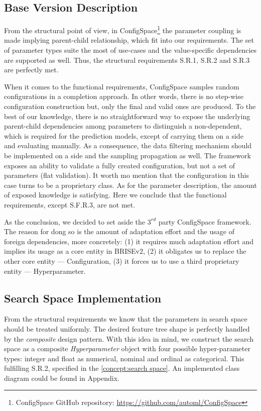 \subsection{Base Version Description}
From the structural point of view, in ConfigSpace\footnote{ConfigSpace GitHub repository: \url{https://github.com/automl/ConfigSpace}} the parameter coupling is made implying parent-child relationship, which fit into our requirements. The set of parameter types suite the most of use-cases and the value-specific dependencies are supported as well. Thus, the structural requirements S.R.1, S.R.2 and S.R.3 are perfectly met.

When it comes to the functional requirements, ConfigSpace samples random configurations in a completion approach. In other words, there is no step-wise configuration construction but, only the final and valid ones are produced. To the best of our knowledge, there is no straightforward way to expose the underlying parent-child dependencies among parameters to distinguish a non-dependent, which is required for the prediction models, except of carrying them on a side and evaluating manually. As a consequence, the data filtering mechanism should be implemented on a side and the sampling propagation as well. The framework exposes an ability to validate a fully created configuration, but not a set of parameters (flat validation). It worth mo mention that the configuration in this case turns to be a proprietary class. As for the parameter description, the amount of exposed knowledge is satisfying. Here we conclude that the functional requirements, except S.F.R.3, are not met.

As the conclusion, we decided to set aside the $3^{rd}$ party ConfigSpace framework. The reason for dong so is the amount of adaptation effort and the usage of foreign dependencies, more concretely: (1) it requires much adaptation effort and implies its usage as a core entity in BRISEv2, (2) it obligates us to replace the other core entity — Configuration, (3) it forces us to use a third proprietary entity — Hyperparameter. 

\subsection{Search Space Implementation}\label{impl: search space impl}
From the structural requirements we know that the parameters in search space should be treated uniformly. The desired feature tree shape is perfectly handled by the \emph{composite} design pattern. With this idea in mind, we construct the search space as a composite \emph{Hyperparameter} object with four possible hyper-parameter types: integer and float as numerical, nominal and ordinal as categorical. This fulfilling S.R.2, specified in the \cref{concept:search space}. An implemented class diagram could be found in Appendix.

